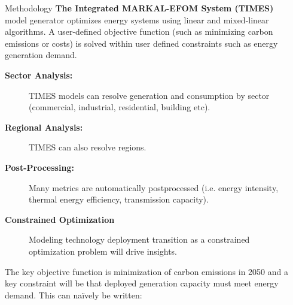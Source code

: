 \documentclass[final]{beamer}
\newlength{\onecolwid}
\newlength{\twocolwid}
\newlength{\threecolwid}
\begin{document}
\begin{frame}[t]
\begin{columns}[t,totalwidth=\threecolwid]
\begin{column}{\twocolwid}
\begin{columns}[t,totalwidth=\twocolwid]
\begin{column}{\onecolwid}

\end{column} %



\begin{column}{\onecolwid} %






\begin{block}{Methodology}
        \textbf{The Integrated MARKAL-EFOM System (TIMES)} model generator 
        \cite{loulou_documentation_2005} 
        \cite{seebregts_energy/environmental_2002} optimizes energy systems 
        using linear and mixed-linear algorithms. A user-defined objective 
        function (such as minimizing carbon emissions or costs) is solved within user defined constraints such as energy generation demand.  


\begin{description}
        \item[\textbf{Sector Analysis:}] TIMES models can resolve generation and 
                 consumption by sector (commercial, industrial, residential, 
                 building etc). 
         \item[\textbf{Regional Analysis:}] TIMES can also resolve regions.
         \item[\textbf{Post-Processing:}] Many metrics are automatically postprocessed 
                 (i.e. energy intensity, thermal energy efficiency, 
                 transmission capacity). 
         \item[\textbf{Constrained Optimization}] Modeling technology deployment 
                 transition as a constrained optimization problem will
                 drive insights.
 \end{description}  

         The key objective function is minimization of carbon emissions in 2050 
         and a key
         constraint will be that deployed generation capacity must meet energy 
         demand. This can na\"ively be written:


\end{block}
\end{column}
\end{columns}
\end{column}
\end{columns}
\end{frame}
\end{document}
